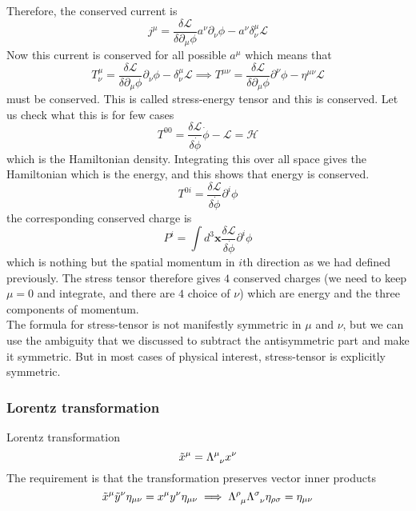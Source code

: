 \documentclass[11pt]{article}
\newcommand{\del}{\partial}
\newcommand{\ld}{\mathcal{L}}
\numberwithin{equation}{section}
\begin{document}
    Therefore, the conserved current is 
    \begin{equation*}
        j^\mu = \frac{\delta \ld}{\delta \del_\mu \phi}a^\nu  \del_\nu \phi  - a^\nu \delta_\nu^\mu \ld
    \end{equation*}
    Now this current is conserved for all possible \(a^\mu\) which means that 
    \begin{equation*}
        T_\nu^\mu = \frac{\delta \ld}{\delta \del_\mu \phi} \del_\nu \phi  -  \delta_\nu^\mu \ld \implies T^{\mu\nu} = \frac{\delta \ld}{\delta \del_\mu \phi} \del^\nu \phi  -  \eta^{\mu\nu} \ld
    \end{equation*}
    must be conserved. This is called stress-energy tensor and this is conserved. Let us check what this is for few cases 
    \begin{equation*}
        T^{00} = \frac{\delta \ld}{\delta \dot{\phi}}  \dot{\phi} - \ld = \mathcal{H}
    \end{equation*}
    which is the Hamiltonian density. Integrating this over all space gives the Hamiltonian which is the energy, and this shows that energy is conserved.
    \begin{equation*}
        T^{0i} = \frac{\delta \ld}{\delta \dot{\phi}} \del^i \phi
    \end{equation*}
    the corresponding conserved charge is 
    \begin{equation*}
        P^i =  \int d^3\textbf{x} \frac{\delta \ld}{\delta \dot{\phi}} \del^i \phi
    \end{equation*}
    which is nothing but the spatial momentum in \(i\)th direction as we had defined previously. The stress tensor therefore gives \(4\) conserved charges (we need to keep \(\mu = 0\) and integrate, and there are \(4\) choice of \(\nu\)) which are energy and the three components of momentum.\\ 

    The formula for stress-tensor is not manifestly symmetric in \(\mu\) and \(\nu\), but we can use the ambiguity that we discussed to subtract the antisymmetric part and make it symmetric. But in most cases of physical interest, stress-tensor is explicitly symmetric.

    \subsubsection{Lorentz transformation}
    Lorentz transformation 
    \begin{equation*}
        \tilde{x}^\mu = \Lambda\indices{^\mu_\nu} x^\nu
    \end{equation*}
    The requirement is that the transformation preserves vector inner products 
    \begin{equation*}
        \tilde{x}^\mu\tilde{y}^\nu \eta_{\mu\nu} = x^\mu y^\nu \eta_{\mu\nu} \implies \Lambda\indices{^\rho_\mu} \Lambda\indices{^\sigma_\nu} \eta_{\rho\sigma} =\eta_{\mu\nu} 
    \end{equation*}
\end{document}
